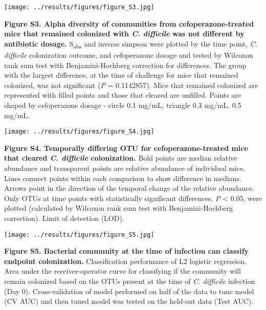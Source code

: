 \documentclass[11pt,]{article}
\begin{document}
\hfill\break

\texttt{[image: ../results/figures/figure\_S3.jpg]}

\textbf{Figure S3. Alpha diversity of communities from
cefoperazone-treated mice that remained colonized with \emph{C.
difficile} was not different by antibiotic dosage.} S\textsubscript{obs}
and inverse simpson were plotted by the time point, \emph{C. difficile}
colonization outcome, and cefoperazone dosage and tested by Wilcoxon
rank sum test with Benjamini-Hochberg correction for differences. The
group with the largest difference, at the time of challenge for mice
that remained colonized, was not significant (\emph{P} = 0.1142857).
Mice that remained colonized are represented with filled points and
those that cleared are unfilled. Points are shaped by cefoperazone
dosage - circle 0.1 mg/mL, triangle 0.3 mg/mL, 0.5 mg/mL.

\hfill\break

\texttt{[image: ../results/figures/figure\_S4.jpg]}

\textbf{Figure S4. Temporally differing OTU for cefoperazone-treated
mice that cleared \emph{C. difficile} colonization.} Bold points are
median relative abundance and transparent points are relative abundance
of individual mice. Lines connect points within each comparison to show
difference in medians. Arrows point in the direction of the temporal
change of the relative abundance. Only OTUs at time points with
statistically significant differences, \emph{P} \textless{} 0.05, were
plotted (calculated by Wilcoxon rank sum test with Benjamini-Hochberg
correction). Limit of detection (LOD).

\hfill\break

\texttt{[image: ../results/figures/figure\_S5.jpg]}

\textbf{Figure S5. Bacterial community at the time of infection can
classify endpoint colonization.} Classification performance of L2
logistic regression. Area under the receiver-operator curve for
classifying if the community will remain colonized based on the OTUs
present at the time of \emph{C. difficile} infection (Day 0).
Cross-validation of model performed on half of the data to tune model
(CV AUC) and then tuned model was tested on the held-out data (Test
AUC).
\end{document}
